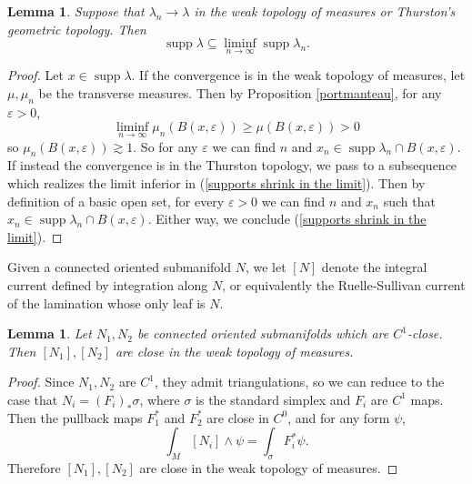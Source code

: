 \documentclass[reqno,11pt]{amsart}
\DeclareMathOperator{\supp}{supp}
\newtheorem{lemma}[theorem]{Lemma}
\theoremstyle{definition}
\numberwithin{equation}{section}
\begin{document}
\begin{lemma}
Suppose that $\lambda_n \to \lambda$ in the weak topology of measures or Thurston's geometric topology.
Then 
\begin{equation}\label{supports shrink in the limit}
\supp \lambda \subseteq \liminf_{n \to \infty} \supp \lambda_n.
\end{equation}
\end{lemma}
\begin{proof}
Let $x \in \supp \lambda$.
If the convergence is in the weak topology of measures, let $\mu, \mu_n$ be the transverse measures.
Then by Proposition \ref{portmanteau}, for any $\varepsilon > 0$,
$$\liminf_{n \to \infty} \mu_n(B(x, \varepsilon)) \geq \mu(B(x, \varepsilon)) > 0$$
so $\mu_n(B(x, \varepsilon)) \gtrsim 1$.
So for any $\varepsilon$ we can find $n$ and $x_n \in \supp \lambda_n \cap B(x, \varepsilon)$.
If instead the convergence is in the Thurston topology, we pass to a subsequence which realizes the limit inferior in (\ref{supports shrink in the limit}).
Then by definition of a basic open set, for every $\varepsilon > 0$ we can find $n$ and $x_n$ such that $x_n \in \supp \lambda_n \cap B(x, \varepsilon)$.
Either way, we conclude (\ref{supports shrink in the limit}).
\end{proof}

Given a connected oriented submanifold $N$, we let $[N]$ denote the integral current defined by integration along $N$, or equivalently the Ruelle-Sullivan current of the lamination whose only leaf is $N$.

\begin{lemma}\label{C1 close implies measure close}
Let $N_1, N_2$ be connected oriented submanifolds which are $C^1$-close.
Then $[N_1], [N_2]$ are close in the weak topology of measures.
\end{lemma}
\begin{proof}
Since $N_1, N_2$ are $C^1$, they admit triangulations, so we can reduce to the case that $N_i = (F_i)_* \sigma$, where $\sigma$ is the standard simplex and $F_i$ are $C^1$ maps.
Then the pullback maps $F_1^*$ and $F_2^*$ are close in $C^0$, and for any form $\psi$,
$$\int_M [N_i] \wedge \psi = \int_\sigma F^*_i \psi.$$
Therefore $[N_1], [N_2]$ are close in the weak topology of measures.
\end{proof}
\end{document}
